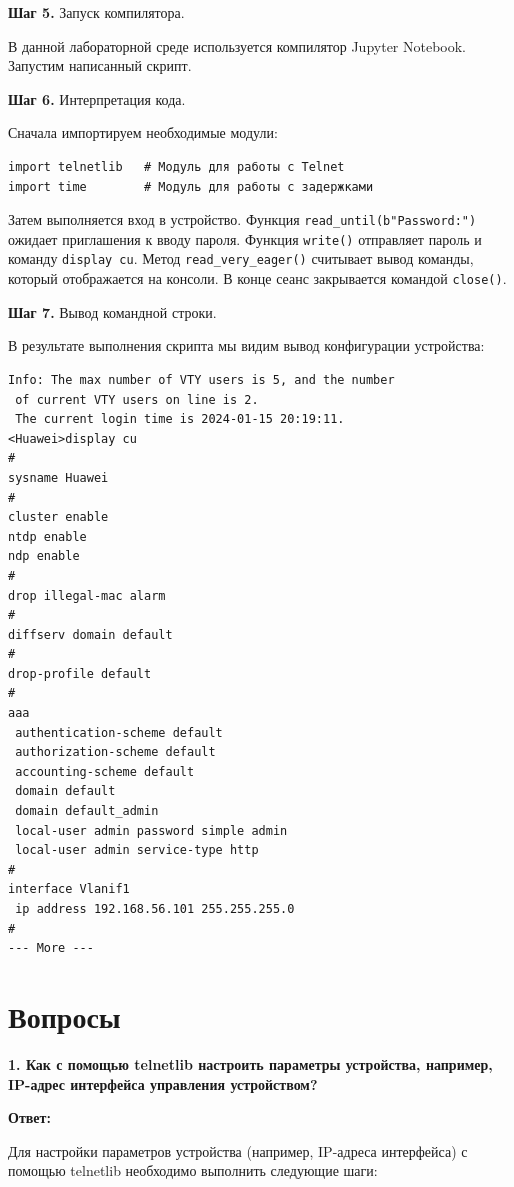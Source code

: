 \textbf{Шаг 5.} Запуск компилятора.

В данной лабораторной среде используется компилятор Jupyter Notebook.
Запустим написанный скрипт.

\textbf{Шаг 6.} Интерпретация кода.

Сначала импортируем необходимые модули:

\begin{verbatim}
import telnetlib   # Модуль для работы с Telnet
import time        # Модуль для работы с задержками
\end{verbatim}

Затем выполняется вход в устройство. Функция \texttt{read\_until(b"Password:")} ожидает приглашения к вводу пароля.
Функция \texttt{write()} отправляет пароль и команду \texttt{display cu}.
Метод \texttt{read\_very\_eager()} считывает вывод команды, который отображается на консоли.
В конце сеанс закрывается командой \texttt{close()}.

\textbf{Шаг 7.} Вывод командной строки.

В результате выполнения скрипта мы видим вывод конфигурации устройства:

\begin{verbatim}
Info: The max number of VTY users is 5, and the number 
 of current VTY users on line is 2. 
 The current login time is 2024-01-15 20:19:11.
<Huawei>display cu
#
sysname Huawei
#
cluster enable
ntdp enable
ndp enable
#
drop illegal-mac alarm
#
diffserv domain default
#
drop-profile default
# 
aaa
 authentication-scheme default
 authorization-scheme default
 accounting-scheme default
 domain default
 domain default_admin
 local-user admin password simple admin
 local-user admin service-type http
#
interface Vlanif1
 ip address 192.168.56.101 255.255.255.0
#
--- More ---
\end{verbatim}

\section{Вопросы}

\textbf{1. Как с помощью telnetlib настроить параметры устройства, например, IP-адрес интерфейса управления устройством?}

\textbf{Ответ:}

Для настройки параметров устройства (например, IP-адреса интерфейса) с помощью telnetlib необходимо выполнить следующие шаги:

